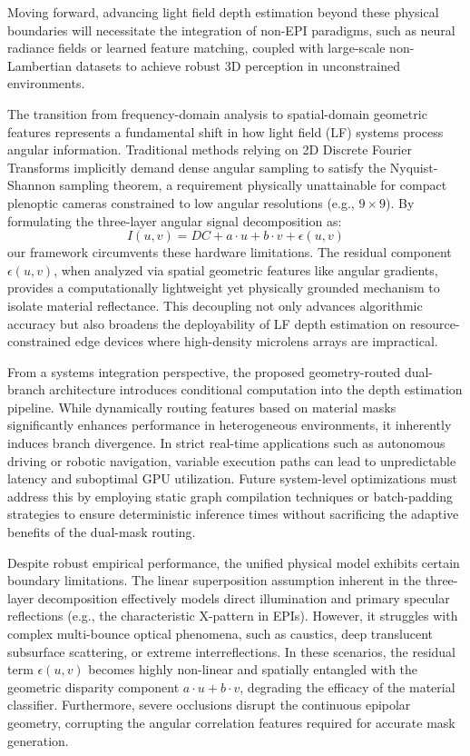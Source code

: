Moving forward, advancing light field depth estimation beyond these physical boundaries will necessitate the integration of non-EPI paradigms, such as neural radiance fields or learned feature matching, coupled with large-scale non-Lambertian datasets to achieve robust 3D perception in unconstrained environments.


The transition from frequency-domain analysis to spatial-domain geometric features represents a fundamental shift in how light field (LF) systems process angular information. Traditional methods relying on 2D Discrete Fourier Transforms implicitly demand dense angular sampling to satisfy the Nyquist-Shannon sampling theorem, a requirement physically unattainable for compact plenoptic cameras constrained to low angular resolutions (e.g., $9 \times 9$). By formulating the three-layer angular signal decomposition as:
\begin{equation}
\label{eq:eq7}
I(u,v) = DC + a\cdot u + b\cdot v + \epsilon(u,v)
\end{equation}
our framework circumvents these hardware limitations. The residual component $\epsilon(u,v)$, when analyzed via spatial geometric features like angular gradients, provides a computationally lightweight yet physically grounded mechanism to isolate material reflectance. This decoupling not only advances algorithmic accuracy but also broadens the deployability of LF depth estimation on resource-constrained edge devices where high-density microlens arrays are impractical.

From a systems integration perspective, the proposed geometry-routed dual-branch architecture introduces conditional computation into the depth estimation pipeline. While dynamically routing features based on material masks significantly enhances performance in heterogeneous environments, it inherently induces branch divergence. In strict real-time applications such as autonomous driving or robotic navigation, variable execution paths can lead to unpredictable latency and suboptimal GPU utilization. Future system-level optimizations must address this by employing static graph compilation techniques or batch-padding strategies to ensure deterministic inference times without sacrificing the adaptive benefits of the dual-mask routing.

Despite robust empirical performance, the unified physical model exhibits certain boundary limitations. The linear superposition assumption inherent in the three-layer decomposition effectively models direct illumination and primary specular reflections (e.g., the characteristic X-pattern in EPIs). However, it struggles with complex multi-bounce optical phenomena, such as caustics, deep translucent subsurface scattering, or extreme interreflections. In these scenarios, the residual term $\epsilon(u,v)$ becomes highly non-linear and spatially entangled with the geometric disparity component $a\cdot u + b\cdot v$, degrading the efficacy of the material classifier. Furthermore, severe occlusions disrupt the continuous epipolar geometry, corrupting the angular correlation features required for accurate mask generation.

